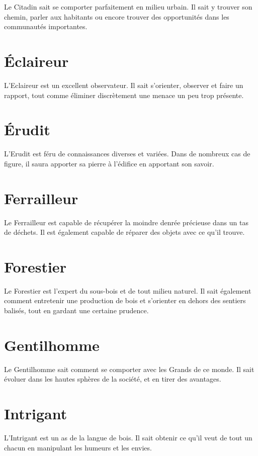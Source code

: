 \documentclass[a4paper,10pt,twoside,twocolumn,openany,bg=print]{dndbook}
\begin{document}
Le Citadin sait se comporter parfaitement en milieu urbain. Il sait y trouver son chemin, parler aux habitants ou encore trouver des opportunités dans les communautés importantes.

\section*{Éclaireur}

L'Eclaireur est un excellent observateur. Il sait s'orienter, observer et faire un rapport, tout comme éliminer discrètement une menace un peu trop présente.

\section*{Érudit}

L'Erudit est féru de connaissances diverses et variées. Dans de nombreux cas de figure, il saura apporter sa pierre à l'édifice en apportant son savoir.

\section*{Ferrailleur}

Le Ferrailleur est capable de récupérer la moindre denrée précieuse dans un tas de déchets. Il est également capable de réparer des objets avec ce qu'il trouve.

\section*{Forestier}

Le Forestier est l'expert du sous-bois et de tout milieu naturel. Il sait également comment entretenir une production de bois et s'orienter en dehors des sentiers balisés, tout en gardant une certaine prudence.

\section*{Gentilhomme}

Le Gentilhomme sait comment se comporter avec les Grands de ce monde. Il sait évoluer dans les hautes sphères de la société, et en tirer des avantages.

\section*{Intrigant}

L'Intrigant est un as de la langue de bois. Il sait obtenir ce qu'il veut de tout un chacun en manipulant les humeurs et les envies.
\end{document}
